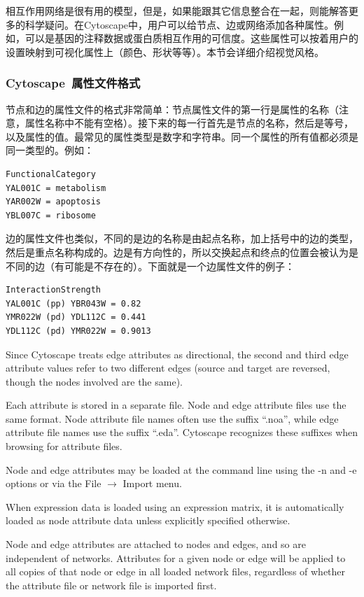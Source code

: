 相互作用网络是很有用的模型，但是，如果能跟其它信息整合在一起，则能解答更多的科学疑问。在Cytoscape中，用户可以给节点、边或网络添加各种属性。例如，可以是基因的注释数据或蛋白质相互作用的可信度。这些属性可以按着用户的设置映射到可视化属性上（颜色、形状等等）。本节会详细介绍视觉风格。

\subsubsection{Cytoscape~属性文件格式}
节点和边的属性文件的格式非常简单：节点属性文件的第一行是属性的名称（注意，属性名称中不能有空格）。接下来的每一行首先是节点的名称，然后是等号，以及属性的值。最常见的属性类型是数字和字符串。同一个属性的所有值都必须是同一类型的。例如：

 \begin{verbatim}
FunctionalCategory
YAL001C = metabolism
YAR002W = apoptosis
YBL007C = ribosome
\end{verbatim}

边的属性文件也类似，不同的是边的名称是由起点名称，加上括号中的边的类型，然后是重点名称构成的。边是有方向性的，所以交换起点和终点的位置会被认为是不同的边（有可能是不存在的）。下面就是一个边属性文件的例子：

 \begin{verbatim}
InteractionStrength
YAL001C (pp) YBR043W = 0.82
YMR022W (pd) YDL112C = 0.441
YDL112C (pd) YMR022W = 0.9013
\end{verbatim}

 Since Cytoscape treats edge attributes as directional, the second and third
edge attribute values refer to two different edges (source and target are
reversed, though the nodes involved are the same). 

 Each attribute is stored in a separate file. Node and edge attribute files use
the same format. Node attribute file names often use the suffix ``.noa'', while
edge attribute file names use the suffix ``.eda''. Cytoscape recognizes these
suffixes when browsing for attribute files. 

 Node and edge attributes may be loaded at the command line using the -n and -e
options or via the File $\rightarrow$ Import menu. 

 When expression data is loaded using an expression matrix, it is automatically
loaded as node attribute data unless explicitly specified otherwise. 



 Node and edge attributes are attached to nodes and edges, and so are
independent of networks. Attributes for a given node or edge will be applied to
all copies of that node or edge in all loaded network files, regardless of
whether the attribute file or network file is imported first. 

